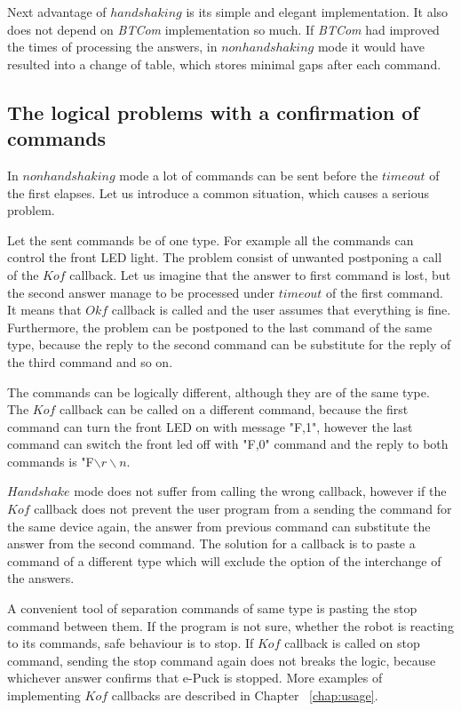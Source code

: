 \documentclass[12pt,notitlepage]{report}
\begin{document}
	Next advantage of $handshaking$ is its simple and elegant implementation. It also does not depend on {\it BTCom} implementation so much.
	If {\it BTCom} had improved the times of processing the answers,
	in $nonhandshaking$ mode it would have resulted into a change of table, which stores minimal gaps after each command.



	\subsection{The logical problems with a confirmation of commands}\label{sec:logical}
	In $nonhandshaking$ mode a lot of commands can be sent before the $timeout$ of the first elapses.
	Let us introduce a common situation, which causes a serious problem. 
	
	Let the sent commands be of one type. For example all the commands can control the front LED light.	
	The problem consist of unwanted postponing a call of the $Kof$ callback. 
	Let us imagine that the answer to first command
	is lost, but the second answer manage to be processed under $timeout$ of the first command.
	It means that $Okf$ callback is called and the user assumes that everything is fine.
	Furthermore, the problem can be postponed to the last command of the same type,
	because the reply to the second command can be substitute for the reply of the third command
	and so on.

	The commands can be logically different, although they are of the same type.
	The $Kof$ callback can be called on a different command, because the first command can turn the front LED on 
	with message "F,1", however the last command can switch the front led off with "F,0" command and 
	the reply to both commands is "F$\backslash r\backslash n$.

	$Handshake$ mode does not suffer from calling the wrong callback, however if the $Kof$ callback
	does not prevent the user program from a sending the command for the same device again,
	the answer from previous command can substitute the answer from the second command.
	The solution for a callback is to paste a command of a different type which will exclude the option
	of the interchange of the answers.

	A convenient tool of separation commands of same type is pasting the stop command between them.
	If the program is not sure, whether the robot is reacting to its commands, safe behaviour is to stop.
	If $Kof$ callback is called on stop command, sending the stop command again does not breaks the logic,
	because whichever answer confirms that e-Puck is stopped. More examples of implementing $Kof$ callbacks
	are described in Chapter ~\ref{chap:usage}.
\end{document}
